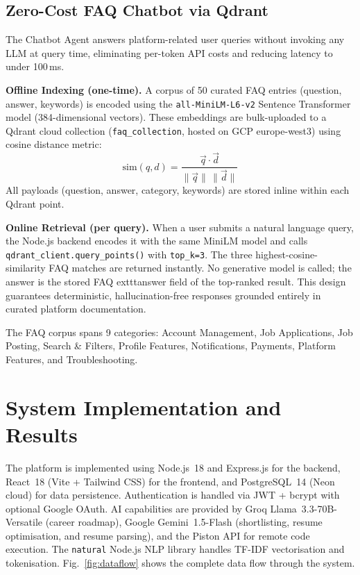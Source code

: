 \documentclass[conference]{IEEEtran}
\begin{document}
\subsection{Zero-Cost FAQ Chatbot via Qdrant}

The Chatbot Agent answers platform-related user queries without invoking any LLM at query time, eliminating per-token API costs and reducing latency to under 100\,ms.

\textbf{Offline Indexing (one-time).} A corpus of 50 curated FAQ entries (question, answer, keywords) is encoded using the \texttt{all-MiniLM-L6-v2} Sentence Transformer model (384-dimensional vectors). These embeddings are bulk-uploaded to a Qdrant cloud collection (\texttt{faq\_collection}, hosted on GCP europe-west3) using cosine distance metric:
\begin{equation}
\text{sim}(q, d) = \frac{\vec{q}\cdot\vec{d}}{\|\vec{q}\|\,\|\vec{d}\|}
\end{equation}
All payloads (question, answer, category, keywords) are stored inline within each Qdrant point.

\textbf{Online Retrieval (per query).} When a user submits a natural language query, the Node.js backend encodes it with the same MiniLM model and calls \texttt{qdrant\_client.query\_points()} with \texttt{top\_k=3}. The three highest-cosine-similarity FAQ matches are returned instantly. No generative model is called; the answer is the stored FAQ 	exttt{answer} field of the top-ranked result. This design guarantees deterministic, hallucination-free responses grounded entirely in curated platform documentation.

The FAQ corpus spans 9 categories: Account Management, Job Applications, Job Posting, Search \& Filters, Profile Features, Notifications, Payments, Platform Features, and Troubleshooting.

\section{System Implementation and Results}

The platform is implemented using Node.js~18 and Express.js for the backend, React~18 (Vite + Tailwind CSS) for the frontend, and PostgreSQL~14 (Neon cloud) for data persistence. Authentication is handled via JWT + bcrypt with optional Google OAuth. AI capabilities are provided by Groq Llama~3.3-70B-Versatile (career roadmap), Google Gemini~1.5-Flash (shortlisting, resume optimisation, and resume parsing), and the Piston API for remote code execution. The \texttt{natural} Node.js NLP library handles TF-IDF vectorisation and tokenisation. Fig.~\ref{fig:dataflow} shows the complete data flow through the system.
\end{document}
